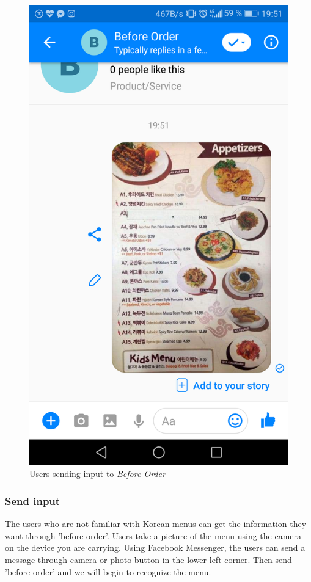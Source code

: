 \begin{figure}[htbp]
\centerline{\includegraphics[height=\custompicheight]{./pictures/facebook_user_input}}
\caption{Users sending input to \emph{Before Order}}
\label{fig:Before Order_send_Input}
\end{figure}
\FloatBarrier
\subsubsection{Send input}
The users who are not familiar with Korean menus can get the information they want through 'before order'. Users take a picture of the menu using the camera on the device you are carrying. Using Facebook Messenger, the users can send a message through camera or photo button in the lower left corner. Then send 'before order' and we will begin to recognize the menu.


